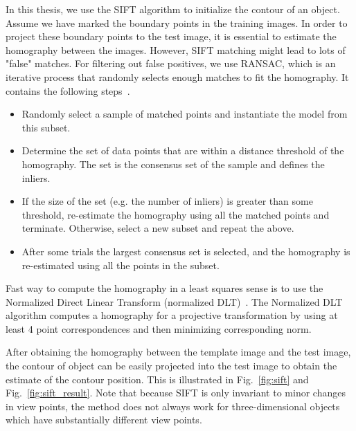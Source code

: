 
In this thesis, we use the SIFT algorithm to initialize the
contour of an object. Assume we have marked the boundary points in the
training images. In order to project these boundary points to the test
image, it is essential to estimate the homography between the
images. However, SIFT matching
might lead to lots of "false" matches. %
For filtering out false positives, we use RANSAC, which is an
iterative process that randomly selects enough matches to fit the
homography. It contains the following steps~\cite{fischler1981random}.

\begin{itemize}
\item  Randomly select a sample of matched points and instantiate the
  model from this subset.
\item Determine the set of data points that are within a distance
  threshold of the homography. The set is the consensus set of the sample
  and defines the inliers.
\item If the size of the set (e.g. the number of inliers) is greater
  than some threshold, re-estimate the homography using all the matched
  points and terminate. Otherwise, select a new subset and repeat the
  above.
\item After some trials the largest consensus set is selected, and the
  homography is re-estimated using all the points in the subset.
\end{itemize}
Fast way to compute the homography in a least squares sense is to use the Normalized
Direct Linear Transform (normalized
DLT)~\cite{hartley2003multiple}. The Normalized DLT algorithm computes
a homography for a projective transformation by using at least 4 point
correspondences and then minimizing corresponding norm.

After obtaining the homography between the template image and the
test image, the contour of object can be easily projected
into the test image to obtain the estimate of the contour
position. This is illustrated in Fig.~\ref{fig:sift} and
Fig.~\ref{fig:sift_result}. Note that because SIFT is only invariant
to minor changes in view points, the method does not always work for
three-dimensional objects which have substantially different view points.

